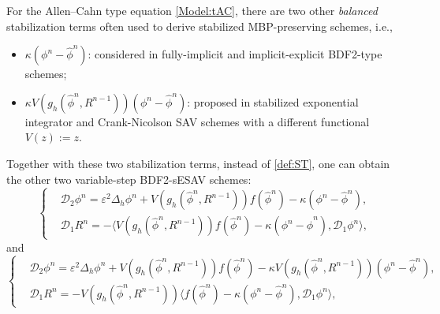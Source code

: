 \documentclass{m2an}
\newcommand{\md}{\mathcal{D}}
\begin{document}
\begin{rmrk}\label{def:other_S} 
	For the Allen--Cahn type equation \eqref{Model:tAC}, there are two other \textit{balanced} stabilization terms often used to derive stabilized MBP-preserving schemes, i.e.,
	\begin{itemize}
		\item $ \kappa ( \phi^{n} - \hat{\phi}^{n} ) $: considered in fully-implicit \cite{SINUM_2020_Liao} and implicit-explicit \cite{MOC_2023_Ju} BDF2-type schemes;
		
		\item $ \kappa V ( g_h(\hat{\phi}^{n}, R^{n-1}) ) ( \phi^{n} - \hat{\phi}^{n} ) $: proposed in stabilized exponential integrator \cite{SINUM_Ju_2022} and Crank-Nicolson \cite{JSC_Ju_2022} SAV schemes with a different functional $ V ( z ) := z $.
	\end{itemize}
	Together with these two stabilization terms, instead of \eqref{def:ST}, one can obtain the other two variable-step BDF2-sESAV schemes: 
	\begin{equation*}\label{sch:2_2_1}
		\left\{
		\begin{aligned}
			&\md_{2} \phi^{n}  = \varepsilon^2 \Delta_h \phi^{n} + V( g_h(\hat{\phi}^{n}, R^{n-1}) ) f(\hat{\phi}^{n}) - \kappa ( \phi^{n} - \hat{\phi}^{n} ),\\
			&\md_{1} R^{n}  = - \big\langle V ( g_h(\hat{\phi}^{n}, R^{n-1}) ) f(\hat{\phi}^{n}) - \kappa(\phi^{n} - \hat{\phi}^{n}), \md_{1} \phi^{n} \big\rangle,
		\end{aligned}
		\right.
	\end{equation*}
	and  
	\begin{equation*}\label{sch:2_3_1}
		\left\{
		\begin{aligned}
			& \md_{2} \phi^{n}  = \varepsilon^2 \Delta_h \phi^{n} + V( g_h(\hat{\phi}^{n}, R^{n-1}) ) f(\hat{\phi}^{n}) - \kappa V ( g_h(\hat{\phi}^{n}, R^{n-1}) ) ( \phi^{n} -  \hat{\phi}^{n} ),\\
			& \md_{1} R^{n}  = - V ( g_h(\hat{\phi}^{n}, R^{n-1}) ) \big\langle f(\hat{\phi}^{n}) - \kappa ( \phi^{n} - \hat{\phi}^{n} ), \md_{1} \phi^{n} \big\rangle,

\end{aligned}
\end{equation*}
\end{rmrk}
\end{document}
